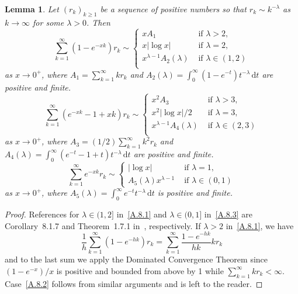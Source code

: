 \documentclass[11pt]{article}
\newtheorem{lemm}[theo]{Lemma}
\theoremstyle{definition}
\numberwithin{equation}{section}
\numberwithin{figure}{section}
\numberwithin{table}{section}
\newcommand{\gl}{\lambda}
\newcommand{\dd}{\mathrm{d}}
\begin{document}
\pagebreak

\begin{lemm}\label{seriesAsymptotics}
Let $(r_k)_{k\ge1}$ be a sequence of positive numbers so that $r_k\sim k^{-\gl}$ as $k\to\infty$ for some $\gl>0$. Then
\begin{equation} \tag{i} \label{A.8.1}
\sum_{k=1}^\infty (1-e^{-xk})r _k\sim
\begin{cases} x A_1& \text{ if } \gl>2, \\
x |{\log x}| & \text{ if } \gl=2, \\
x^{\gl-1}A_2(\gl) & \text{ if } \gl\in(1, 2) \\
\end{cases}
\end{equation}
as $x\to 0^+$, where $A_1=\sum_{k=1}^\infty k r_k$ and $A_2(\gl)=\int_0^\infty (1-e^{-t}) t^{-\gl}\, \dd t$ are positive and finite.
\begin{equation} \tag{ii} \label{A.8.2}
\sum_{k=1}^\infty (e^{-xk}-1+xk) r_k\sim
\begin{cases} x^2 A_3& \text{ if } \gl>3, \\
x^2|{\log x}|/2 & \text{ if } \gl=3, \\
x^{\gl-1}A_4(\gl) & \text{ if } \gl\in(2, 3) \\
\end{cases}
\end{equation}
as $x\to 0^+$, where $A_3=(1/2)\sum_{k=1}^\infty k^2 r_k$ and $A_4(\gl)=\int_0^\infty (e^{-t}-1+t) t^{-\gl}\, \dd t$ are positive and finite.
\begin{equation} \tag{iii} \label{A.8.3}
\sum_{k=1}^\infty e^{-xk} r_k \sim
\begin{cases}
|{\log x}| & \text{ if } \gl = 1,\\[2pt] A_5(\gl) x^{\gl-1}& \text{ if } \gl \in (0,1)
\end{cases}
\end{equation}
as $x\to 0^+$, where $A_5(\gl)=\int_0^\infty e^{-t}t^{-\gl}\, \dd t$ is positive and finite.
\end{lemm}

\begin{proof}
References for $\gl\in (1,2]$ in~\eqref{A.8.1} and $\gl\in(0,1]$ in~\eqref{A.8.3} are Corollary~8.1.7 and Theorem~1.7.1 in~\cite{BGT89}, respectively. If $\gl>2$ in~\eqref{A.8.1}, we have
\[
\frac{1}{h}\sum_{k=1}^\infty (1-e^{-hk}) r_k=\sum_{k=1}^\infty \frac{1-e^{-hk}}{hk} k r_k
\]
and to the last sum we apply the Dominated Convergence Theorem since $(1-e^{-x})/x$ is positive and bounded from above by 1 while $\sum_{k=1}^\infty k r_k<\infty$. Case~\eqref{A.8.2} follows from similar arguments and is left to the reader.
\end{proof}
\end{document}
